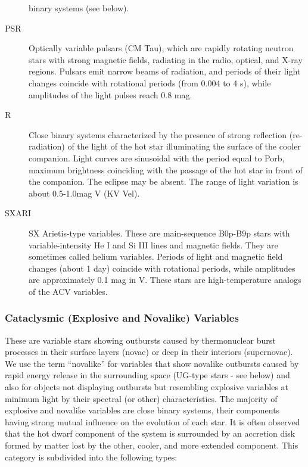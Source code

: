 \begin{description}
				binary systems (see below).
\item[PSR]		Optically variable pulsars (CM Tau), which are rapidly
				rotating neutron stars with strong magnetic fields, radiating in the
				radio, optical, and X-ray regions. Pulsars emit narrow beams of
				radiation, and periods of their light changes coincide with rotational
				periods (from 0.004 to 4 s), while amplitudes of the light pulses reach
				0.8 mag.
\item[R]        Close binary systems characterized by the presence of
                strong reflection (re-radiation) of the light of the hot star
                illuminating the surface of the cooler companion. Light curves are
                sinusoidal with the period equal to Porb, maximum brightness coinciding
                with the passage of the hot star in front of the companion. The eclipse
                may be absent. The range of light variation is about 0.5-1.0mag V (KV Vel).
\item[SXARI] 	SX Arietis-type variables. These are main-sequence
				B0p-B9p stars with variable-intensity He I and Si III lines and magnetic
				fields. They are sometimes called helium variables. Periods of light and
				magnetic field changes (about 1 day) coincide with rotational periods,
				while amplitudes are approximately 0.1 mag in V. These stars are
				high-temperature analogs of the ACV variables.
\end{description}

\subsubsection{Cataclysmic (Explosive and Novalike) Variables}
\label{cataclysmic-explosive-and-novalike-variables}

These are variable stars showing outbursts caused by thermonuclear burst
processes in their surface layers (novae) or deep in their interiors
(supernovae). We use the term ``novalike'' for variables that show
novalike outbursts caused by rapid energy release in the surrounding
space (UG-type stars - see below) and also for objects not displaying
outbursts but resembling explosive variables at minimum light by their
spectral (or other) characteristics. The majority of explosive and
novalike variables are close binary systems, their components having
strong mutual influence on the evolution of each star. It is often
observed that the hot dwarf component of the system is surrounded by an
accretion disk formed by matter lost by the other, cooler, and more
extended component. This category is subdivided into the following
types:


